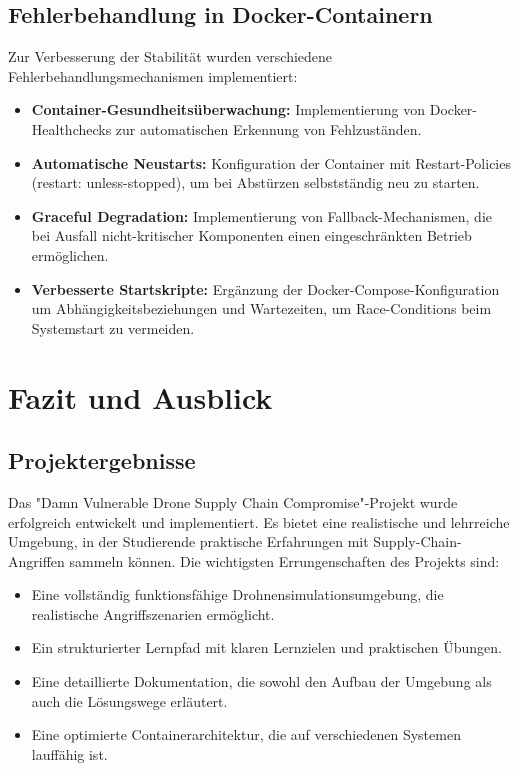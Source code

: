 \documentclass[12pt]{scrartcl}
\begin{document}
    \subsection{Fehlerbehandlung in Docker-Containern}
    
    Zur Verbesserung der Stabilität wurden verschiedene Fehlerbehandlungsmechanismen implementiert:
    
    \begin{itemize}
        \item \textbf{Container-Gesundheitsüberwachung:} Implementierung von Docker-Healthchecks zur automatischen Erkennung von Fehlzuständen.
        
        \item \textbf{Automatische Neustarts:} Konfiguration der Container mit Restart-Policies (restart: unless-stopped), um bei Abstürzen selbstständig neu zu starten.
        
        \item \textbf{Graceful Degradation:} Implementierung von Fallback-Mechanismen, die bei Ausfall nicht-kritischer Komponenten einen eingeschränkten Betrieb ermöglichen.
        
        \item \textbf{Verbesserte Startskripte:} Ergänzung der Docker-Compose-Konfiguration um Abhängigkeitsbeziehungen und Wartezeiten, um Race-Conditions beim Systemstart zu vermeiden.
    \end{itemize}

    \newpage

    \section{Fazit und Ausblick}
    
    \subsection{Projektergebnisse}
    
    Das "Damn Vulnerable Drone Supply Chain Compromise"-Projekt wurde erfolgreich entwickelt und implementiert. Es bietet eine realistische und lehrreiche Umgebung, in der Studierende praktische Erfahrungen mit Supply-Chain-Angriffen sammeln können. Die wichtigsten Errungenschaften des Projekts sind:
    
    \begin{itemize}
        \item Eine vollständig funktionsfähige Drohnensimulationsumgebung, die realistische Angriffszenarien ermöglicht.
        
        \item Ein strukturierter Lernpfad mit klaren Lernzielen und praktischen Übungen.
        
        \item Eine detaillierte Dokumentation, die sowohl den Aufbau der Umgebung als auch die Lösungswege erläutert.
        
        \item Eine optimierte Containerarchitektur, die auf verschiedenen Systemen lauffähig ist.
    \end{itemize}
    
\end{document}

